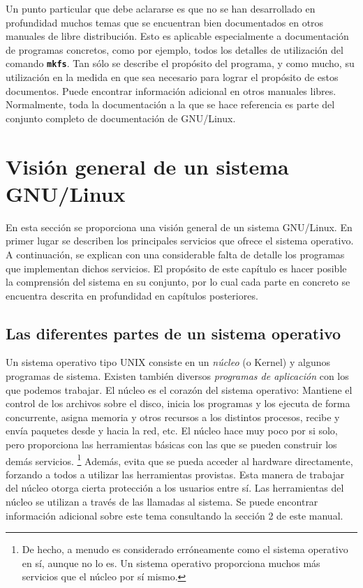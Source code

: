 \documentclass[12pt]{article}
\begin{document}
\begin{}
Un punto particular que debe aclararse es que no se han desarrollado en
profundidad muchos temas que se encuentran bien documentados en otros manuales
de libre distribución. Esto es aplicable especialmente a documentación de
programas concretos, como por ejemplo, todos los detalles de utilización del
comando \texttt{\textbf{mkfs}}. Tan sólo se describe el propósito del programa,
y como mucho, su utilización en la medida en que sea necesario para lograr el
propósito de estos documentos. Puede encontrar información adicional en otros
manuales libres. Normalmente, toda la documentación a la que se hace referencia
es parte del conjunto completo de documentación de GNU/Linux.  



\section{Visión general de un sistema GNU/Linux}

En esta sección se proporciona una visión
general de un sistema GNU/Linux.  En primer lugar se describen los principales
servicios que ofrece el sistema operativo.  A continuación, se explican con una
considerable falta de detalle los programas que implementan dichos servicios. El
propósito de este capítulo es hacer posible la comprensión del sistema en su
conjunto, por lo cual cada parte en concreto se encuentra descrita en
profundidad en capítulos posteriores.  


\subsection{Las diferentes partes de un sistema operativo}

 Un sistema operativo tipo UNIX consiste en un
\textit{núcleo} (o Kernel) y algunos programas de sistema. Existen
también diversos \textit{programas de aplicación} con los que
podemos trabajar.  El núcleo es el corazón del sistema operativo: Mantiene el
control de los archivos sobre el disco, inicia los programas y los ejecuta de
forma concurrente, asigna memoria y otros recursos a los distintos procesos,
recibe y envía paquetes desde y hacia la red, etc. El núcleo hace muy poco por
si solo, pero proporciona las herramientas básicas con las que se pueden
construir los demás servicios.
\footnote{De hecho, a menudo es considerado erróneamente como el sistema
operativo en sí, aunque no lo es. Un sistema operativo proporciona muchos más
servicios que el núcleo	por sí mismo.}
Además, evita que se pueda acceder al hardware
directamente, forzando a todos a utilizar las herramientas provistas. Esta
manera de trabajar del núcleo otorga cierta protección a los usuarios entre sí.
Las herramientas del núcleo se utilizan a través de las llamadas al sistema. Se
puede encontrar información adicional sobre este tema consultando la sección 2
de este manual.


\end{}
\end{document}
